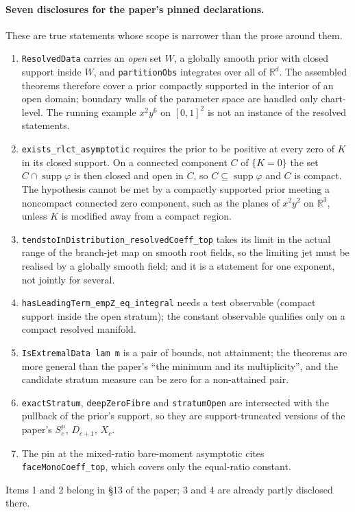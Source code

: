 \documentclass[11pt]{article}
\begin{document}
\paragraph{Seven disclosures for the paper's pinned declarations.} These are true statements whose scope is narrower than the prose around them.
\begin{enumerate}[nosep]
\item \texttt{ResolvedData} carries an \emph{open} set $W$, a globally smooth prior with closed support inside $W$, and \texttt{partitionObs} integrates over all of $\mathbb R^d$. The assembled theorems therefore cover a prior compactly supported in the interior of an open domain; boundary walls of the parameter space are handled only chart-level. The running example $x^2y^6$ on $[0,1]^2$ is not an instance of the resolved statements.
\item \texttt{exists\_rlct\_asymptotic} requires the prior to be positive at every zero of $K$ in its closed support. On a connected component $C$ of $\{K=0\}$ the set $C\cap\operatorname{supp}\varphi$ is then closed and open in $C$, so $C\subseteq\operatorname{supp}\varphi$ and $C$ is compact. The hypothesis cannot be met by a compactly supported prior meeting a noncompact connected zero component, such as the planes of $x^2y^2$ on $\mathbb R^3$, unless $K$ is modified away from a compact region.
\item \texttt{tendstoInDistribution\_resolvedCoeff\_top} takes its limit in the actual range of the branch-jet map on smooth root fields, so the limiting jet must be realised by a globally smooth field; and it is a statement for one exponent, not jointly for several.
\item \texttt{hasLeadingTerm\_empZ\_eq\_integral} needs a test observable (compact support inside the open stratum); the constant observable qualifies only on a compact resolved manifold.
\item \texttt{IsExtremalData lam m} is a pair of bounds, not attainment; the theorems are more general than the paper's ``the minimum and its multiplicity'', and the candidate stratum measure can be zero for a non-attained pair.
\item \texttt{exactStratum}, \texttt{deepZeroFibre} and \texttt{stratumOpen} are intersected with the pullback of the prior's support, so they are support-truncated versions of the paper's $S^\mu_c$, $D_{c+1}$, $X_c$.
\item The pin at the mixed-ratio bare-moment asymptotic cites \texttt{faceMonoCoeff\_top}, which covers only the equal-ratio constant.
\end{enumerate}
Items 1 and 2 belong in \S13 of the paper; 3 and 4 are already partly disclosed there.
\end{document}
